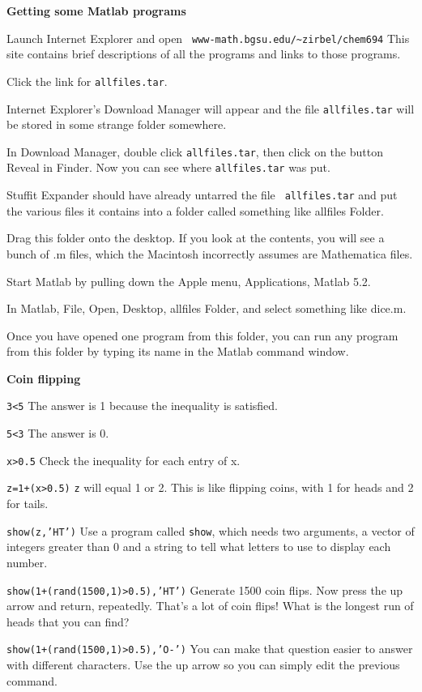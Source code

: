 \hspace*{-0.5in}
{\bf Getting some Matlab programs}

\item Launch Internet Explorer and open {\tt
www-math.bgsu.edu/\~{}zirbel/chem694} 
This site contains brief descriptions of all the programs and links to
those programs.

\item Click the link for {\tt allfiles.tar}.

\item Internet Explorer's Download Manager will appear and the file
{\tt allfiles.tar} will be stored in some strange folder somewhere.

\item In Download Manager, double click {\tt allfiles.tar}, then click on
the button Reveal in Finder.  Now you can see where {\tt allfiles.tar} was
put.

\item Stuffit Expander should have already untarred the file {\tt
allfiles.tar} and put the various files it contains into a folder called
something like allfiles Folder.

\item Drag this folder onto the desktop.  If you look at the contents, you
will see a bunch of .m files, which the Macintosh incorrectly assumes are
Mathematica files.

\item Start Matlab by pulling down the Apple menu, Applications, Matlab
5.2.

\item In Matlab, File, Open, Desktop, allfiles Folder, and select something
like dice.m.

\item Once you have opened one program from this folder, you can run any
program from this folder by typing its name in the Matlab command window.

\hspace*{-0.5in}
{\bf Coin flipping}

\item {\tt 3<5} \hfill The answer is 1 because the inequality is satisfied.
\item {\tt 5<3} \hfill The answer is 0.
\item {\tt x>0.5} \hfill Check the inequality for each entry of x.  
\item {\tt z=1+(x>0.5)} \hfill {\tt z} will equal 1 or 2.  This is
like flipping coins, with 1 for heads and 2 for tails.
\item {\tt show(z,'HT')} \hfill Use a program called {\tt show},
which needs two arguments, a vector of integers greater than 0 and a string
to tell what letters to use to display each number.
\item {\tt show(1+(rand(1500,1)>0.5),'HT')} \hfill Generate 1500 coin
flips.  Now press the up arrow and return, repeatedly.  That's a lot of
coin flips!  What is the longest run of heads that you can find?
\item {\tt show(1+(rand(1500,1)>0.5),'O-')} \hfill You can make that
question easier to answer with different characters.  Use the up arrow so
you can simply edit the previous command.


